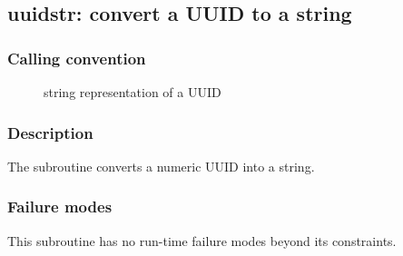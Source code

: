 \clearpage
{}
{}
\label{subr:uuidstr}
\subsection*{uuidstr: convert a UUID to a string}

\subsubsection*{Calling convention}

\begin{description}
\item[] string representation of a UUID
\end{description}

\subsubsection*{Description}

The  subroutine converts a numeric UUID into a string.

\subsubsection*{Failure modes}

This subroutine has no run-time failure modes beyond its constraints.

